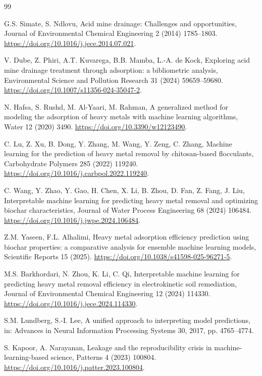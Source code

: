 \documentclass[review,12pt,number]{elsarticle}
\begin{document}
\begin{thebibliography}{99}

G.S. Simate, S. Ndlovu, Acid mine drainage: Challenges and opportunities, Journal of Environmental Chemical Engineering 2 (2014) 1785--1803. \url{https://doi.org/10.1016/j.jece.2014.07.021}.

V. Dube, Z. Phiri, A.T. Kuvarega, B.B. Mamba, L.-A. de Kock, Exploring acid mine drainage treatment through adsorption: a bibliometric analysis, Environmental Science and Pollution Research 31 (2024) 59659--59680. \url{https://doi.org/10.1007/s11356-024-35047-2}.

N. Hafsa, S. Rushd, M. Al-Yaari, M. Rahman, A generalized method for modeling the adsorption of heavy metals with machine learning algorithms, Water 12 (2020) 3490. \url{https://doi.org/10.3390/w12123490}.

C. Lu, Z. Xu, B. Dong, Y. Zhang, M. Wang, Y. Zeng, C. Zhang, Machine learning for the prediction of heavy metal removal by chitosan-based flocculants, Carbohydrate Polymers 285 (2022) 119240. \url{https://doi.org/10.1016/j.carbpol.2022.119240}.

C. Wang, Y. Zhao, Y. Gao, H. Chen, X. Li, B. Zhou, D. Fan, Z. Fang, J. Liu, Interpretable machine learning for predicting heavy metal removal and optimizing biochar characteristics, Journal of Water Process Engineering 68 (2024) 106484. \url{https://doi.org/10.1016/j.jwpe.2024.106484}.

Z.M. Yaseen, F.L. Alhalimi, Heavy metal adsorption efficiency prediction using biochar properties: a comparative analysis for ensemble machine learning models, Scientific Reports 15 (2025). \url{https://doi.org/10.1038/s41598-025-96271-5}.

M.S. Barkhordari, N. Zhou, K. Li, C. Qi, Interpretable machine learning for predicting heavy metal removal efficiency in electrokinetic soil remediation, Journal of Environmental Chemical Engineering 12 (2024) 114330. \url{https://doi.org/10.1016/j.jece.2024.114330}.

S.M. Lundberg, S.-I. Lee, A unified approach to interpreting model predictions, in: Advances in Neural Information Processing Systems 30, 2017, pp. 4765--4774.

S. Kapoor, A. Narayanan, Leakage and the reproducibility crisis in machine-learning-based science, Patterns 4 (2023) 100804. \url{https://doi.org/10.1016/j.patter.2023.100804}.


\end{thebibliography}
\end{document}
